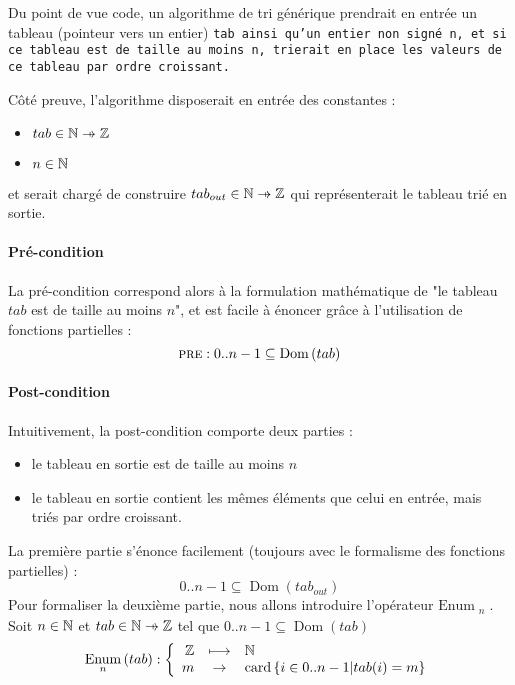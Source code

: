 \documentclass[a4paper, 11pt]{article}
\newcommand{\pto}{\mathrel{\ooalign{\hfil$\mapstochar$\hfil\cr$\to$\cr}}}
\DeclareMathOperator{\card}{card}
\DeclareMathOperator{\eenu}{Enum}
\DeclareMathOperator{\ddom}{Dom}
\newcommand{\dom}[1]{\ddom\left(#1\right)}
\newcommand{\enu}[2]{\eenu_{\substack{#1}}\left(#2\right)}
\theoremstyle{mystyle}
\begin{document}
Du point de vue code, un algorithme de tri générique prendrait en entrée un tableau (pointeur vers un entier) \tt{tab} ainsi qu'un entier non signé \tt{n}, et si ce tableau est de taille au moins \tt{n}, trierait en place les valeurs de ce tableau par ordre croissant.

Côté preuve, l'algorithme disposerait en entrée des constantes :
\begin{itemize}
    \item $tab \in \N \pto \Z$
    \item $n \in \mathbb{N}$
\end{itemize}
et serait chargé de construire $tab_{out} \in \N \pto \Z$ qui représenterait le tableau trié en sortie.

\paragraph{Pré-condition}\mbox{}

La pré-condition correspond alors à la formulation mathématique de "le tableau $tab$ est de taille au moins $n$", et est facile à énoncer grâce à l'utilisation de fonctions partielles :
\[
    \text{\sc{pre}}: 0..n - 1 \subseteq \dom{tab}
\]

\paragraph{Post-condition}\mbox{}

Intuitivement, la post-condition comporte deux parties :
\begin{itemize}
    \item le tableau en sortie est de taille au moins $n$
    \item le tableau en sortie contient les mêmes éléments que celui en entrée, mais triés par ordre croissant.
\end{itemize}

\medskip

\noindent{}La première partie s'énonce facilement (toujours avec le formalisme des fonctions partielles) :
\[
    0..n - 1 \subseteq \dom{tab_{out}}
\]
Pour formaliser la deuxième partie, nous allons introduire l'opérateur $\text{Enum}_{\substack{n}}$.\\
Soit $n \in \mathbb{N}$ et $tab \in \N \pto \Z$ tel que $0..n - 1 \subseteq \dom{tab}$
\[
    \enu{n}{tab} : \left\{\begin{array}{rcl}
        \Z &\lsto& \N \\
        m &\to& \card\left\{ i \in 0..n - 1 | tab(i) = m \right\} 
    \end{array}\right.
\]
\end{document}
